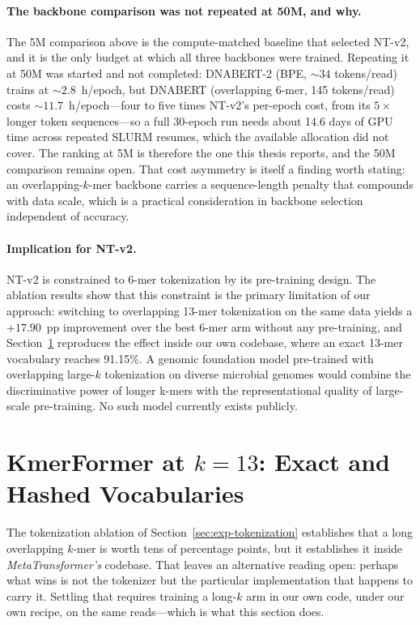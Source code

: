 \paragraph{The backbone comparison was not repeated at 50M, and why.}
The 5M comparison above is the compute-matched baseline that selected NT-v2, and it
is the only budget at which all three backbones were trained. Repeating it at 50M was
started and not completed: DNABERT-2 (BPE, ${\sim}34$ tokens/read) trains at
${\sim}2.8$~h/epoch, but DNABERT (overlapping 6-mer, 145 tokens/read) costs
${\sim}11.7$~h/epoch---four to five times NT-v2's per-epoch cost, from its $5\times$
longer token sequences---so a full 30-epoch run needs about 14.6 days of GPU time
across repeated SLURM resumes, which the available allocation did not cover. The
ranking at 5M is therefore the one this thesis reports, and the 50M comparison remains
open. That cost asymmetry is itself a finding worth stating: an overlapping-$k$-mer
backbone carries a sequence-length penalty that compounds with data scale, which is a
practical consideration in backbone selection independent of accuracy.

\paragraph{Implication for NT-v2.}
NT-v2 is constrained to 6-mer tokenization by its pre-training design. The ablation results show that this constraint is the primary limitation of our approach: switching to overlapping 13-mer tokenization on the same data yields a $+17.90$~pp improvement over the best 6-mer arm without any pre-training, and Section~\ref{sec:exp-thirteenmer} reproduces the effect inside our own codebase, where an exact 13-mer vocabulary reaches 91.15\%. A genomic foundation model pre-trained with overlapping large-$k$ tokenization on diverse microbial genomes would combine the discriminative power of longer k-mers with the representational quality of large-scale pre-training. No such model currently exists publicly.

\section{KmerFormer at $k=13$: Exact and Hashed Vocabularies}
\label{sec:exp-thirteenmer}

The tokenization ablation of Section~\ref{sec:exp-tokenization} establishes that a long overlapping $k$-mer is worth tens of percentage points, but it establishes it inside \emph{MetaTransformer's} codebase. That leaves an alternative reading open: perhaps what wins is not the tokenizer but the particular implementation that happens to carry it. Settling that requires training a long-$k$ arm in our own code, under our own recipe, on the same reads---which is what this section does.

